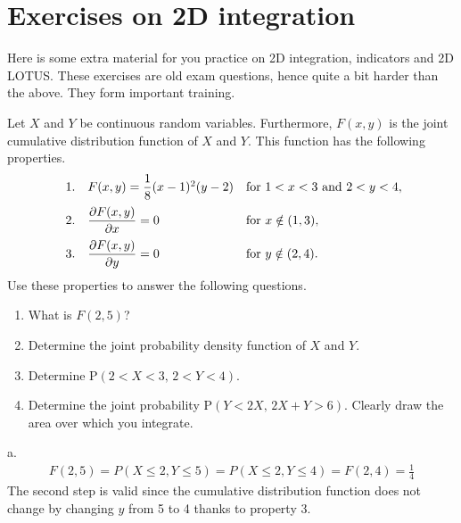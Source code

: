 


\section{Exercises on 2D integration}
\label{sec:exerc-2d-integr}

Here is some extra material for you practice on 2D integration, indicators and 2D LOTUS. These exercises are old exam questions, hence quite a bit harder than the above.  They form important training.

\begin{exercise}
Let $X$ and $Y$ be continuous random variables. Furthermore, $F(x,y)$ is the joint cumulative distribution function of $X$ and $Y$. This function has the following properties.
\begin{align*}\
    \begin{array}{lll}
        1. &F(x,y) = \dfrac{1}{8}(x-1)^2(y-2) & \text{for } 1< x<3 \text{ and  } 2< y< 4,\vspace{0.2cm}\\
        2. &\dfrac{\partial F(x,y)}{\partial x}=0& \text{for } x\notin (1,3),\vspace{0.2cm}\\
        3. &\dfrac{\partial F(x,y)}{\partial y}=0&\text{for } y\notin (2, 4).
    \end{array}
\end{align*}
Use these properties to answer the following questions.
\begin{enumerate}
\item  What is $F(2,5)$?
\item  Determine the joint probability density function of $X$ and $Y$.
\item  Determine $\text{P}(2<X<3,\, 2<Y<4)$.
\item  Determine the joint probability $\text{P}(Y<2X,\, 2X+Y>6)$. Clearly draw the area over which you integrate.
\end{enumerate}
\begin{solution}
a.  \begin{align*}
                F(2,5) = P(X\leq 2,Y\leq 5) = P(X\leq 2,Y\leq 4) = F(2,4) = \frac{1}{4}
    \end{align*}
    The second step is valid since the cumulative distribution function does not change by changing $y$ from 5 to 4 thanks to property 3.


\end{solution}
\end{exercise}
